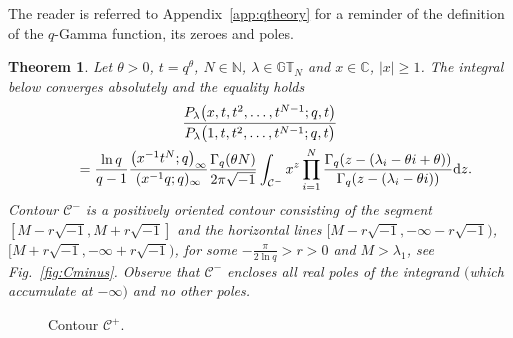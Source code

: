 \documentclass[pdftex]{sigma}
\numberwithin{equation}{section}
\newtheorem{thm}{Theorem}[section]
\newcommand{\C}{\mathbb{C}}
\newcommand{\N}{\mathbb{N}}
\newcommand{\CC}{\mathcal{C}}
\newcommand{\GT}{\mathbb{GT}}
\begin{document}
The reader is referred to Appendix~\ref{app:qtheory} for a reminder of the def\/inition of the $q$-Gamma function, its zeroes and poles.

\begin{thm}\label{macdonaldthm25}
Let $\theta > 0$, $t = q^{\theta}$, $N\in\N$, $\lambda\in\GT_N$ and $x\in\C$, $|x|\geq 1$. The integral below converges absolutely and the equality holds
\begin{gather}
\frac{P_{\lambda}\big(x, t, t^2, \dots, t^{N-1}; q, t\big)}{P_{\lambda}\big(1, t, t^2, \dots, t^{N-1}; q, t\big)} \nonumber\\
\qquad{} = \frac{\ln q}{q - 1}\frac{\big(x^{-1}t^N; q\big)_{\infty}}{(x^{-1}q; q)_{\infty}}\frac{\Gamma_q(\theta N)}{2\pi\sqrt{-1}}\int_{\CC^-}{x^z\prod_{i=1}^N{\frac{\Gamma_q(z -( \lambda_i - \theta i + \theta))}{\Gamma_q(z - (\lambda_i - \theta i))}}{\rm d}z}.\label{macdonaldthm25eqn}
\end{gather}
Contour $\CC^-$ is a positively oriented contour consisting of the segment $[M-r\sqrt{-1}, M+r\sqrt{-1}]$ and the horizontal lines $[M-r\sqrt{-1}, -\infty-r\sqrt{-1})$, $[M+r\sqrt{-1}, -\infty+r\sqrt{-1})$, for some $-\frac{\pi}{2\ln{q}} > r > 0$ and $M > \lambda_1$, see Fig.~{\rm \ref{fig:Cminus}}. Observe that $\CC^-$ encloses all real poles of the integrand $($which accumulate at $-\infty)$ and no other poles.
\end{thm}

\begin{figure}[t]\centering
{}
\caption{Contour $\CC^+$.}\label{fig:C}
\end{figure}
\end{document}
